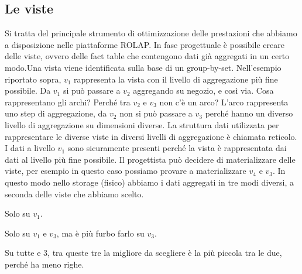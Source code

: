 \subsection{Le viste}
Si tratta del principale strumento di ottimizzazione delle prestazioni che abbiamo a disposizione nelle piattaforme ROLAP.\newline
In fase progettuale è possibile creare delle viste, ovvero delle fact table che contengono dati già aggregati in un certo modo.\newline Una vista viene identificata sulla base di un group-by-set.
\noindent Nell'esempio riportato sopra, $v_1$ rappresenta la vista con il livello di aggregazione più fine possibile. Da $v_1$ si può passare a $v_2$ aggregando su negozio, e così via. Cosa rappresentano gli archi? Perché tra $v_2$ e $v_3$ non c'è un arco?\newline
L'arco rappresenta uno step di aggregazione, da $v_2$ non si può passare a $v_3$ perché hanno un diverso livello di aggregazione su dimensioni diverse. La struttura dati utilizzata per rappresentare le diverse viste in diversi livelli di aggregazione è chiamata reticolo.\newline\newline
I dati a livello $v_1$ sono sicuramente presenti perché la vista è rappresentata dai dati al livello più fine possibile. Il progettista può decidere di materializzare delle viste, per esempio in questo caso possiamo provare a materializzare $v_4$ e $v_3$.\newline
In questo modo nello storage (fisico) abbiamo i dati aggregati in tre modi diversi, a seconda delle viste che abbiamo scelto.
\begin{question}
	Solo su $v_1$.
\end{question}

\begin{question}
	Solo su $v_1$ e $v_3$, ma è più furbo farlo su $v_3$.
\end{question}

\begin{question}
	Su tutte e 3, tra queste tre la migliore da scegliere è la più piccola tra le due, perché ha meno righe.
\end{question}

